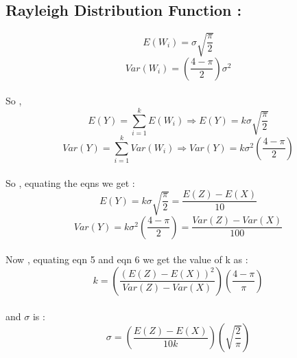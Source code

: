 \documentclass{article}
\begin{document}
    \subsection{Rayleigh Distribution Function :}
    \vspace{5pt}
    \setcounter{equation}{0}
    \begin{equation}
        E(W_i) = \sigma \sqrt{\frac{\pi}{2}} 
    \end{equation}
    \begin{equation}
        Var(W_i) = \left(\frac{4-\pi}{2}\right)\sigma^2 
    \end{equation}
    \\So ,
    \begin{equation}
        E(Y) = \sum_{i = 1}^{k} E(W_i)
        \Rightarrow E(Y) = k\sigma\sqrt{\frac{\pi}{2}} 
    \end{equation}
    \begin{equation}
        Var(Y) = \sum_{i = 1}^{k} Var(W_i)
        \Rightarrow Var(Y) = k\sigma^2\left(\frac{4-\pi}{2}\right)
    \end{equation}
    \vspace{5pt}
    \\So , equating the eqns we get : 
    \begin{equation}
        E(Y) = k\sigma\sqrt{\frac{\pi}{2}} = \frac{E(Z) - E(X)}{10}
    \end{equation}
    \begin{equation}
        Var(Y) = k\sigma^2\left(\frac{4-\pi}{2}\right) = \frac{Var(Z) - Var(X)}{100}
    \end{equation}
    \vspace{5pt}
    \\Now , equating eqn 5 and eqn 6 we get the value of k as : 
    \begin{equation}
        k = \left(\frac{(E(Z) - E(X))^2}{Var(Z) - Var(X)}\right)\left(\frac{4-\pi}{\pi}\right)
    \end{equation}
    \vspace{5pt}
    \\ and $\sigma$ is :
    \begin{equation}
        \sigma = \left(\frac{E(Z) - E(X)}{10k}\right)\left(\sqrt{\frac{2}{\pi}}\right)
    \end{equation}
\end{document}
